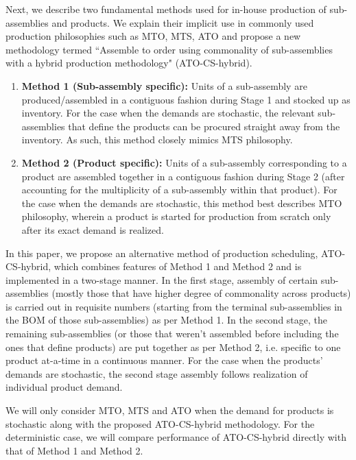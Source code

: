 \documentclass[twoside,onecolumn,12pt,letterpaper]{article}
\begin{document}
Next, we describe two fundamental methods used for in-house production of sub-assemblies and products. We explain their implicit use in commonly used production philosophies such as MTO, MTS, ATO and propose a new methodology termed ``Assemble to order using commonality of sub-assemblies with a hybrid production methodology" (ATO-CS-hybrid). 
\begin{enumerate}
\item \textbf{Method 1 (Sub-assembly specific):} Units of a sub-assembly are produced/assembled in a contiguous fashion during Stage 1 and stocked up as inventory. For the case when the demands are stochastic, the relevant sub-assemblies that define the products can be procured straight away from the inventory. As such, this method closely mimics MTS philosophy.
\item \textbf{Method 2 (Product specific):} Units of a sub-assembly corresponding to a product are assembled together in a contiguous fashion during Stage 2 (after accounting for the multiplicity of a sub-assembly within that product). For the case when the demands are stochastic, this method best describes MTO philosophy, wherein a product is started for production from scratch only after its exact demand is realized.
\end{enumerate}

In this paper, we propose an alternative method of production scheduling, ATO-CS-hybrid, which combines features of Method 1 and Method 2 and is implemented in a two-stage manner. In the first stage, assembly of certain sub-assemblies (mostly those that have higher degree of commonality across products) is carried out in requisite numbers (starting from the terminal sub-assemblies in the BOM of those sub-assemblies) as per Method 1. In the second stage, the remaining sub-assemblies (or those that weren't assembled before including the ones that define products) are put together as per Method 2, i.e. specific to one product at-a-time in a continuous manner. For the case when the products' demands are stochastic, the second stage assembly follows realization of individual product demand. 

We will only consider MTO, MTS and ATO when the demand for products is stochastic along with the proposed ATO-CS-hybrid methodology. For the deterministic case, we will compare performance of ATO-CS-hybrid directly with that of Method 1 and Method 2.
\end{document}

